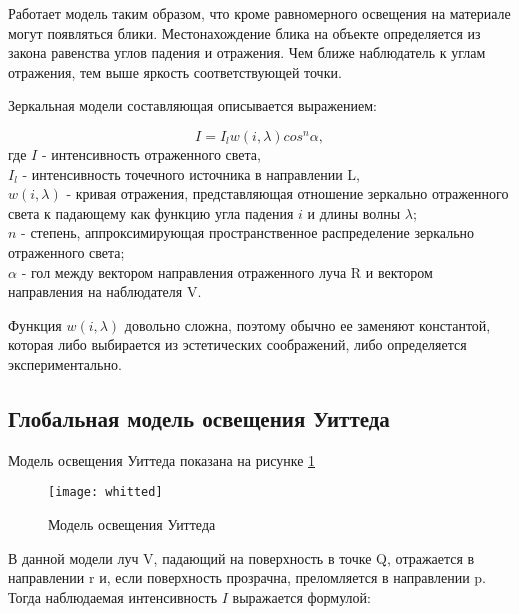 Работает модель
таким образом, что кроме равномерного освещения на материале могут появляться
блики. Местонахождение блика на объекте определяется из закона равенства углов
падения и отражения. Чем ближе наблюдатель к углам отражения, тем выше
яркость соответствующей точки.

Зеркальная модели составляющая описывается выражением:

\begin{equation}\label{phong_ref_eq}
	I = I_l w(i, \lambda) cos^n \alpha,
\end{equation}
где $I$ - интенсивность отраженного света,\\
\text{~~~~~}$I_l$ - интенсивность точечного источника в направлении L,\\
\text{~~~~~}$w(i, \lambda)$ - кривая отражения, представляющая отношение зеркально отраженного света к падающему как функцию угла падения $i$ и длины волны $\lambda$;\\
\text{~~~~~}$n$ - степень, аппроксимирующая пространственное распределение зеркально отраженного света;\\
\text{~~~~~}$\alpha$ - гол между вектором направления отраженного луча R и
вектором направления на наблюдателя V.

Функция $w(i, \lambda)$ довольно
сложна, поэтому обычно ее заменяют константой, которая либо выбирается из
эстетических соображений, либо определяется экспериментально.

\subsection{Глобальная модель освещения Уиттеда}

Модель освещения Уиттеда показана на рисунке \ref{whitted}

\begin{figure}[H]
	\centering
	\texttt{[image: whitted]}
	\caption{Модель освещения Уиттеда}
	\label{whitted}
\end{figure}

В данной модели луч V, падающий на поверхность в точке Q, отражается в
направлении r и, если поверхность прозрачна, преломляется в направлении p. Тогда наблюдаемая интенсивность $I$ выражается формулой:

